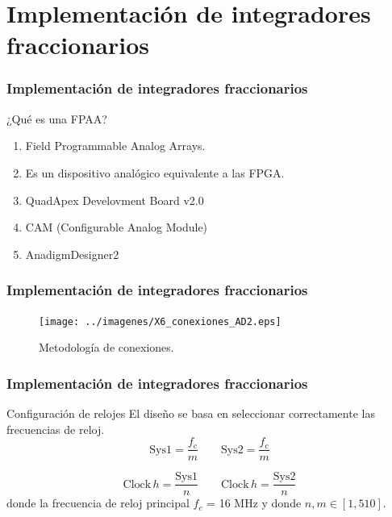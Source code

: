 \documentclass[10pt]{beamer}
\begin{document}
	\section{Implementación de integradores fraccionarios}
	\begin{frame}
		\frametitle{Implementación de integradores fraccionarios}
		\begin{block}{¿Qué es una FPAA?}
			\begin{enumerate}
				\item Field Programmable Analog Arrays.
				\item Es un dispositivo analógico equivalente a las FPGA.
				\item QuadApex Develovment Board v2.0
				\item CAM (Configurable Analog Module)
				\item AnadigmDesigner2
			\end{enumerate}
		\end{block}
	\end{frame}
	\begin{frame}
		\frametitle{Implementación de integradores fraccionarios}
			\begin{figure}[hbtp]
			\caption{Metodología de conexiones.}
			\centering
			\texttt{[image: ../imagenes/X6\_conexiones\_AD2.eps]}
			\end{figure}
	\end{frame}
	\begin{frame}
		\frametitle{Implementación de integradores fraccionarios}
		\begin{block}{Configuración de relojes}
		El diseño se basa en seleccionar correctamente las frecuencias de reloj.
		\begin{equation}
			\mathrm{Sys1} = \frac{f_{c}}{m} \qquad \mathrm{Sys2} = \frac{f_{c}}{m}
			\label{ec:sys_clock}
		\end{equation}
		
		\begin{equation}
		\mathrm{Clock\,} h = \frac{\mathrm{Sys1}}{n}	\qquad   \mathrm{Clock\,} h = \frac{\mathrm{Sys2}}{n}
		\label{ec:clock_h}
		\end{equation}
		\justifying
		donde la frecuencia de reloj principal $f_{c}$ = 16 MHz y donde $n,m\in[1,510]$.
		\end{block}
	\end{frame}
\end{document}
